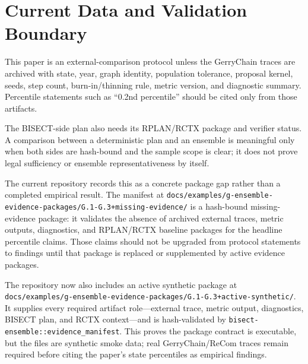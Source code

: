 \section{Current Data and Validation Boundary}

This paper is an external-comparison protocol unless the GerryChain traces are
archived with state, year, graph identity, population tolerance, proposal
kernel, seeds, step count, burn-in/thinning rule, metric version, and diagnostic
summary.  Percentile statements such as ``0.2nd percentile'' should be cited
only from those artifacts.

The BISECT-side plan also needs its RPLAN/RCTX package and verifier status.  A
comparison between a deterministic plan and an ensemble is meaningful only when
both sides are hash-bound and the sample scope is clear; it does not prove legal
sufficiency or ensemble representativeness by itself.

The current repository records this as a concrete package gap rather than a
completed empirical result.  The manifest at
\texttt{docs/examples/g-ensemble-evidence-packages/G.1-G.3+missing-evidence/}
is a hash-bound missing-evidence package: it validates the absence of archived
external traces, metric outputs, diagnostics, and RPLAN/RCTX baseline packages
for the headline percentile claims.  Those claims should not be upgraded from
protocol statements to findings until that package is replaced or supplemented
by active evidence packages.

The repository now also includes an active synthetic package at
\texttt{docs/examples/g-ensemble-evidence-packages/G.1-G.3+active-synthetic/}.
It supplies every required artifact role---external trace, metric output,
diagnostics, BISECT plan, and RCTX context---and is hash-validated by
\texttt{bisect-ensemble::evidence\_manifest}.  This proves the package contract
is executable, but the files are synthetic smoke data; real GerryChain/ReCom
traces remain required before citing the paper's state percentiles as empirical
findings.
